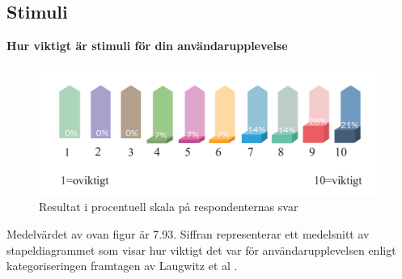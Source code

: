 \subsection{Stimuli}

\centerline{\textbf{Hur viktigt är stimuli för 
din användarupplevelse}}

\begin{figure}[H]
  \centering
  \includegraphics[scale=0.7]{Rityta_12.pdf}
  \centering
  \captionsetup{justification=centering,margin=2cm}
  \caption{Resultat i procentuell skala på respondenternas svar}
\end{figure} 

Medelvärdet av ovan figur är 7.93. Siffran representerar ett medelsnitt av stapeldiagrammet som visar hur viktigt det var för användarupplevelsen enligt kategoriseringen framtagen av Laugwitz et al \cite{Laugwitz2008ConstructionQuestionnaire}. 

  


